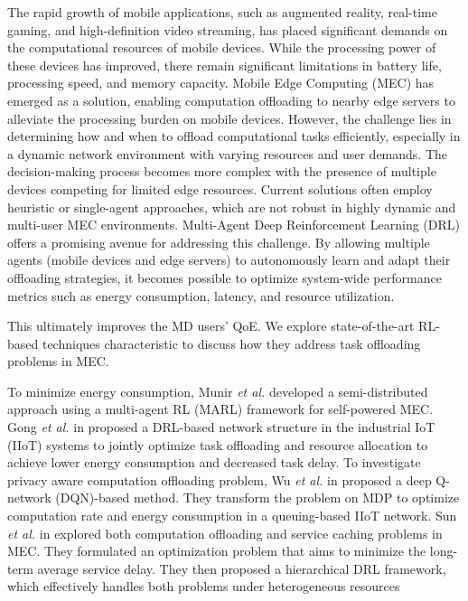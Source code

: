 \documentclass[12pt]{article}
\begin{document}
\newpage

The rapid growth of mobile applications, such as augmented reality, real-time gaming, and high-definition video streaming, has placed significant demands on the computational resources of mobile devices. While the processing power of these devices has improved, there remain significant limitations in battery life, processing speed, and memory capacity. Mobile Edge Computing (MEC) has emerged as a solution, enabling computation offloading to nearby edge servers to alleviate the processing burden on mobile devices. However, the challenge lies in determining how and when to offload computational tasks efficiently, especially in a dynamic network environment with varying resources and user demands. The decision-making process becomes more complex with the presence of multiple devices competing for limited edge resources. Current solutions often employ heuristic or single-agent approaches, which are not robust in highly dynamic and multi-user MEC environments. Multi-Agent Deep Reinforcement Learning (DRL) offers a promising avenue for addressing this challenge. By allowing multiple agents (mobile devices and edge servers) to autonomously learn and adapt their offloading strategies, it becomes possible to optimize system-wide performance metrics such as energy consumption, latency, and resource utilization. 




 This ultimately improves the MD users' QoE. We explore state-of-the-art RL-based techniques characteristic to discuss how they address task offloading problems in MEC. 
 
 To minimize energy consumption, Munir \textit{et al.} \cite{munir2021multi} developed a semi-distributed approach using a multi-agent RL (MARL) framework for self-powered MEC. Gong \textit{et al.} in \cite{gong2022edge} proposed a DRL-based network structure in the industrial IoT (IIoT) systems to jointly optimize task offloading and resource allocation to achieve lower energy consumption and decreased task delay. To investigate privacy aware computation offloading problem, Wu \textit{et al.} in \cite{wu2024combining} proposed a deep Q-network (DQN)-based method. They transform the problem on MDP to optimize computation rate and energy consumption in a queuing-based IIoT network. Sun \textit{et al.} in \cite{sun2024hierarchical} explored both computation offloading and service caching problems in MEC. They formulated an optimization problem that aims to minimize the long-term average service delay. They then proposed a hierarchical DRL framework, which effectively handles both problems under heterogeneous resources
 
\end{document}

